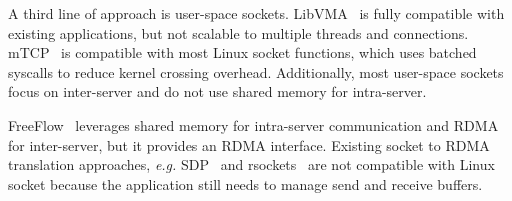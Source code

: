 A third line of approach is user-space sockets.
LibVMA~\cite{libvma} is fully compatible with existing applications, but not scalable to multiple threads and connections.
mTCP~\cite{jeong2014mtcp} is compatible with most Linux socket functions, which uses batched syscalls to reduce kernel crossing overhead.
Additionally, most user-space sockets focus on inter-server and do not use shared memory for intra-server.

FreeFlow~\cite{freeflow} leverages shared memory for intra-server communication and RDMA for inter-server, but it provides an RDMA interface.
Existing socket to RDMA translation approaches, \textit{e.g.} SDP~\cite{socketsdirect} and rsockets~\cite{rsockets} are not compatible with Linux socket because the application still needs to manage send and receive buffers.






\iffalse
Kernel-bypass TCP/IPs
IX [OSDI’14], Arrakis [OSDI’14], UTCP [CCR’14], Sandstorm [SIGCOMM’14], mTCP [NSDI’14], Seastar

Socket API enhancements
MegaPipe [OSDI’12], FlexSC [OSDI’10], KCM [Linux]

Improving OS stack with fast packet I/O
mSwitch [SOSR’15]

In-stack improvement
FastSocket [ASPLOS’16]

Running kernel stack in user-space
Rump [AsiaBSDCon’09], NUSE [netdev’15]
\fi




